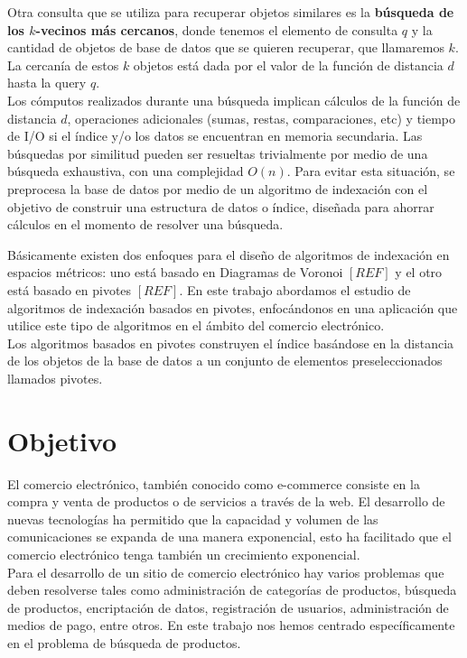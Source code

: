 Otra consulta que se utiliza para recuperar objetos similares es la \textbf{b\'usqueda de los $k$-vecinos m\'as cercanos}, donde tenemos el elemento de consulta $q$ y la cantidad de objetos de base de datos que se quieren recuperar, que llamaremos $k$. La cercan\'ia de estos $k$ objetos est\'a dada por el valor de la funci\'on de distancia $d$ hasta la query $q$.\\
				
Los c\'omputos realizados durante una b\'usqueda implican c\'alculos de la funci\'on de distancia $d$, operaciones adicionales (sumas, restas, comparaciones, etc) y tiempo de I/O si el \'indice y/o los datos se encuentran en memoria secundaria. Las b\'usquedas por similitud pueden ser resueltas trivialmente por medio de una b\'usqueda exhaustiva, con una complejidad $O(n)$. Para evitar esta situaci\'on, se preprocesa la base de datos por medio de un algoritmo de indexaci\'on con el objetivo de construir una estructura de datos o \'indice, diseñada para ahorrar c\'alculos en el momento de resolver una b\'usqueda. 
					
B\'asicamente existen dos enfoques para el diseño de algoritmos de indexaci\'on en espacios m\'etricos: uno est\'a basado en Diagramas de Voronoi $[REF]$ y el otro est\'a basado en pivotes $[REF]$. En este trabajo abordamos el estudio de algoritmos de indexaci\'on basados en pivotes, enfoc\'andonos en una aplicaci\'on que utilice este tipo de algoritmos en el \'ambito del comercio electr\'onico.\\
					
Los algoritmos basados en pivotes construyen el \'indice bas\'andose en la distancia de los objetos de la base de datos a un conjunto de elementos preseleccionados llamados pivotes.

\section{Objetivo}

El comercio electr\'onico, tambi\'en conocido como e-commerce consiste en la compra y venta de productos o de servicios a trav\'es de la web. El desarrollo de nuevas tecnolog\'ias ha permitido que la capacidad y volumen de las comunicaciones se expanda de una manera exponencial, esto ha facilitado que el comercio electr\'onico tenga tambi\'en un crecimiento exponencial.\\
					
Para el desarrollo de un sitio de comercio electr\'onico hay varios problemas que deben resolverse tales como administraci\'on de categor\'ias de productos, b\'usqueda de productos, encriptaci\'on de datos, registraci\'on de usuarios, administraci\'on de medios de pago, entre otros. En este trabajo nos hemos centrado espec\'ificamente en el problema de b\'usqueda de productos.\\
					
